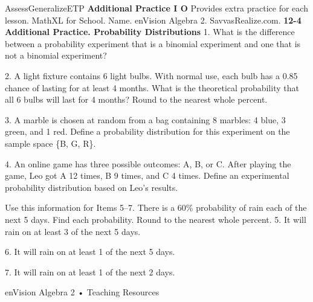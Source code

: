 \documentclass{article}
\newenvironment{te-addendum}[2]{}{}     %
\newcommand{\answer}[1]{}               %
\newcommand{\te}[1]{}                   %
\begin{document}
\begin{te-addendum}{Assess}{GeneralizeETP}
\textbf{Additional Practice I O}
Provides extra practice for each lesson. MathXL for School.
Name. enVision Algebra 2. SavvasRealize.com.
\textbf{12-4 Additional Practice. Probability Distributions}
1. What is the difference between a probability experiment that is a binomial experiment and one that is not a binomial experiment?
\answer{Sample answer: A binomial experiment has a fixed number of trials, there are two possible outcomes for each trial, the probability of each outcome is the same for every trial, and the results of the trials are independent. If any of these conditions are not met, it is not a binomial experiment.}
2. A light fixture contains 6 light bulbs. With normal use, each bulb has a 0.85 chance of lasting for at least 4 months. What is the theoretical probability that all 6 bulbs will last for 4 months? Round to the nearest whole percent.
\answer{38\%}
3. A marble is chosen at random from a bag containing 8 marbles: 4 blue, 3 green, and 1 red. Define a probability distribution for this experiment on the sample space \{B, G, R\}.
\answer{Sample answer: Let P be the function defined on the set \{B, G, R\} such that (P(B)=0.5), (P(G)=0.375), and (P(R)=0.125).}
4. An online game has three possible outcomes: A, B, or C. After playing the game, Leo got A 12 times, B 9 times, and C 4 times. Define an experimental probability distribution based on Leo's results.
\answer{Sample answer: Let P be the function defined on the set \{A, B, C\} such that (P(A)=0.48), (P(B)=0.36), and (P(C)=0.16).}
Use this information for Items 5--7. There is a 60\% probability of rain each of the next 5 days. Find each probability. Round to the nearest whole percent.
5. It will rain on at least 3 of the next 5 days.
\answer{68\%}
6. It will rain on at least 1 of the next 5 days.
\answer{99\%}
7. It will rain on at least 1 of the next 2 days.
\answer{84\%}
\te{Printed rain calculation assumes independent daily outcomes; independence is not stated in the prompt.}
enVision Algebra 2 • Teaching Resources
\end{te-addendum}
\end{document}

